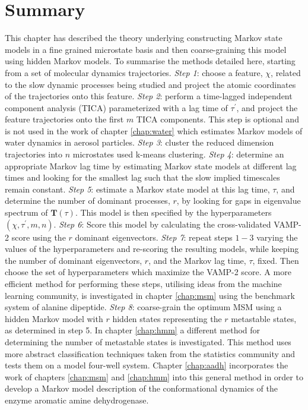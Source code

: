 \section{Summary}
This chapter has described the theory underlying constructing Markov state models in a fine grained microstate basis and then coarse-graining this model using hidden Markov models. To summarise the methods detailed here, starting from a set of molecular dynamics trajectories.  \emph{Step 1}: choose a feature, $\chi$, related to the slow dynamic processes being studied and project the atomic coordinates of the trajectories onto this feature. \emph{Step 2}: perform a time-lagged independent component analysis (TICA) parameterized with a lag time of $\tau^{\prime}$, and project the feature trajectories onto the first $m$ TICA components. This step is optional and is not used in the work of chapter \ref{chap:water} which estimates Markov models of water dynamics in aerosol particles. \emph{Step 3}: cluster the reduced dimension trajectories into $n$ microstates used k-means clustering. \emph{Step 4}: determine an appropriate Markov lag time by estimating Markov state models at different lag times and looking for the smallest lag such that the slow implied timescales remain constant. \emph{Step 5}: estimate a Markov state model at this lag time, $\tau$, and determine the number of dominant processes, $r$, by looking for gaps in eigenvalue spectrum of $\mathbf{T}(\tau)$. This model is then specified by the hyperparameters $(\chi,\tau^{\prime}, m, n)$.  \emph{Step 6}: Score this model by calculating the cross-validated VAMP-2 score using the $r$ dominant eigenvectors.  \emph{Step 7}: repeat steps $1-3$ varying the values of the hyperparameters and re-scoring the resulting models, while keeping the number of dominant eigenvectors, $r$,  and the Markov lag time, $\tau$, fixed. Then choose the set of hyperparameters which maximize the VAMP-2 score.  A more efficient method for performing these steps, utilising ideas from the machine learning community, is investigated in chapter \ref{chap:msm} using the benchmark system of alanine dipeptide. \emph{Step 8}: coarse-grain the optimum MSM using a hidden Markov model with $r$ hidden states representing the $r$ metastable states, as determined in step 5.  In chapter \ref{chap:hmm} a different method for determining the number of metastable states is investigated. This method uses more abstract classification techniques taken from the statistics community and tests them on a model four-well system.  Chapter \ref{chap:aadh} incorporates the work of chapters \ref{chap:msm} and \ref{chap:hmm} into this general method in order to develop a Markov model description of the conformational dynamics of the enzyme aromatic amine dehydrogenase. 

